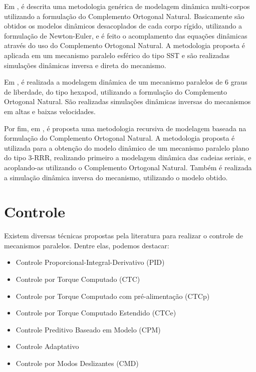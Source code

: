 \documentclass[]{politex}
\begin{document}
Em \cite{Akbarzadeh}, é descrita uma metodologia genérica de modelagem dinâmica multi-corpos utilizando a formulação do Complemento Ortogonal Natural. Basicamente são obtidos os modelos dinâmicos desacoplados de cada corpo rígido, utilizando a formulação de Newton-Euler, e é feito o acomplamento das equações dinâmicas através do uso do Complemento Ortogonal Natural. A metodologia proposta é aplicada em um mecanismo paralelo esférico do tipo SST e são realizadas simulações dinâmicas inversa e direta do mecanismo.

Em \cite{Xi}, é realizada a modelagem dinâmica de um mecanismo paralelos de 6 graus de liberdade, do tipo hexapod, utilizando a formulação do Complemento Ortogonal Natural. São realizadas simulações dinâmicas inversas do mecanismos em altas e baixas velocidades.

Por fim, em \cite{Khan}, é proposta uma metodologia recursiva de modelagem baseada na formulação do Complemento Ortogonal Natural. A metodologia proposta é utilizada para a obtenção do modelo dinâmico de um mecanismo paralelo plano do tipo 3-RRR, realizando primeiro a modelagem dinâmica das cadeias seriais, e acoplando-as utilizando o Complemento Ortogonal Natural. Também é realizada a simulação dinâmica inversa do mecanismo, utilizando o modelo obtido.









\section{Controle}

Existem diversas técnicas propostas pela literatura para realizar o controle de mecanismos paralelos. Dentre elas, podemos destacar:

\begin{itemize}
\item Controle Proporcional-Integral-Derivativo (PID)
\item Controle por Torque Computado (CTC)
\item Controle por Torque Computado com pré-alimentação (CTCp)
\item Controle por Torque Computado Estendido (CTCe)
\item Controle Preditivo Baseado em Modelo (CPM)
\item Controle Adaptativo
\item Controle por Modos Deslizantes (CMD)
\end{itemize}
\end{document}

